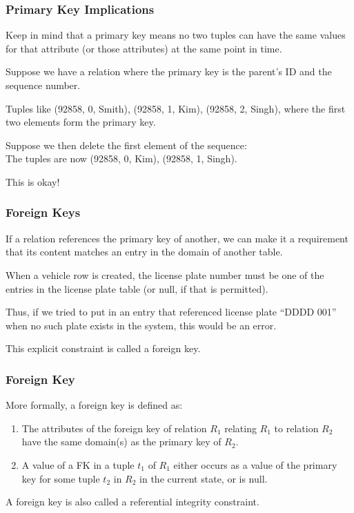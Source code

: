 \begin{frame}
\frametitle{Primary Key Implications}

Keep in mind that a primary key means no two tuples can have the same values for that attribute (or those attributes) at the same point in time. 

Suppose we have a relation where the primary key is the parent's ID and the sequence number. 

Tuples like (92858, 0, Smith), (92858, 1, Kim), (92858, 2, Singh), where the first two elements form the primary key. 

Suppose we then delete the first element of the sequence:\\
\quad The tuples are now (92858, 0, Kim), (92858, 1, Singh). 

This is okay!

\end{frame}



\begin{frame}
\frametitle{Foreign Keys}

If a relation references the primary key of another, we can make it a requirement that its content matches an entry in the domain of another table. 

When a vehicle row is created, the license plate number must be one of the entries in the license plate table (or null, if that is permitted).

Thus, if we tried to put in an entry that referenced license plate ``DDDD 001'' when no such plate exists in the system, this would be an error. 

This explicit constraint is called a \alert{foreign key}. 


\end{frame}



\begin{frame}
\frametitle{Foreign Key}

More formally, a foreign key is defined as:
\begin{enumerate}
\item The attributes of the foreign key of relation $R_{1}$ relating $R_{1}$ to relation $R_{2}$ have the same domain(s) as the primary key of $R_{2}$.
\item A value of a FK in a tuple $t_{1}$ of $R_{1}$ either occurs as a value of the primary key for some tuple $t_{2}$ in $R_{2}$ in the current state, or is null. 
\end{enumerate}

A foreign key is also called a referential integrity constraint.

\end{frame}



